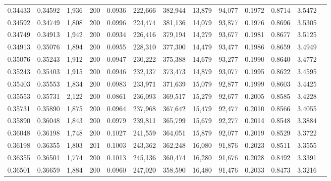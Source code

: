 \begin{tabular}{rrrrrrrrrrrrr}
0.34433 & 0.34592 & 1,936 & 200 &                                     0.0936 & 222,666 & 382,944 &  13,879 &  94,077 & 0.1972 & 0.8714 & 3.5472 \\
0.34592 & 0.34749 & 1,808 & 200 &                                     0.0996 & 224,474 & 381,136 &  14,079 &  93,877 & 0.1976 & 0.8696 & 3.5305 \\
0.34749 & 0.34913 & 1,942 & 200 &                                     0.0934 & 226,416 & 379,194 &  14,279 &  93,677 & 0.1981 & 0.8677 & 3.5125 \\
0.34913 & 0.35076 & 1,894 & 200 &                                     0.0955 & 228,310 & 377,300 &  14,479 &  93,477 & 0.1986 & 0.8659 & 3.4949 \\
0.35076 & 0.35243 & 1,912 & 200 &                                     0.0947 & 230,222 & 375,388 &  14,679 &  93,277 & 0.1990 & 0.8640 & 3.4772 \\
0.35243 & 0.35403 & 1,915 & 200 &                                     0.0946 & 232,137 & 373,473 &  14,879 &  93,077 & 0.1995 & 0.8622 & 3.4595 \\
0.35403 & 0.35553 & 1,834 & 200 &                                     0.0983 & 233,971 & 371,639 &  15,079 &  92,877 & 0.1999 & 0.8603 & 3.4425 \\
0.35553 & 0.35731 & 2,122 & 200 &                                     0.0861 & 236,093 & 369,517 &  15,279 &  92,677 & 0.2005 & 0.8585 & 3.4228 \\
0.35731 & 0.35890 & 1,875 & 200 &                                     0.0964 & 237,968 & 367,642 &  15,479 &  92,477 & 0.2010 & 0.8566 & 3.4055 \\
0.35890 & 0.36048 & 1,843 & 200 &                                     0.0979 & 239,811 & 365,799 &  15,679 &  92,277 & 0.2014 & 0.8548 & 3.3884 \\
0.36048 & 0.36198 & 1,748 & 200 &                                     0.1027 & 241,559 & 364,051 &  15,879 &  92,077 & 0.2019 & 0.8529 & 3.3722 \\
0.36198 & 0.36355 & 1,803 & 201 &                                     0.1003 & 243,362 & 362,248 &  16,080 &  91,876 & 0.2023 & 0.8511 & 3.3555 \\
0.36355 & 0.36501 & 1,774 & 200 &                                     0.1013 & 245,136 & 360,474 &  16,280 &  91,676 & 0.2028 & 0.8492 & 3.3391 \\
0.36501 & 0.36659 & 1,884 & 200 &                                     0.0960 & 247,020 & 358,590 &  16,480 &  91,476 & 0.2033 & 0.8473 & 3.3216 \\

\end{tabular}
